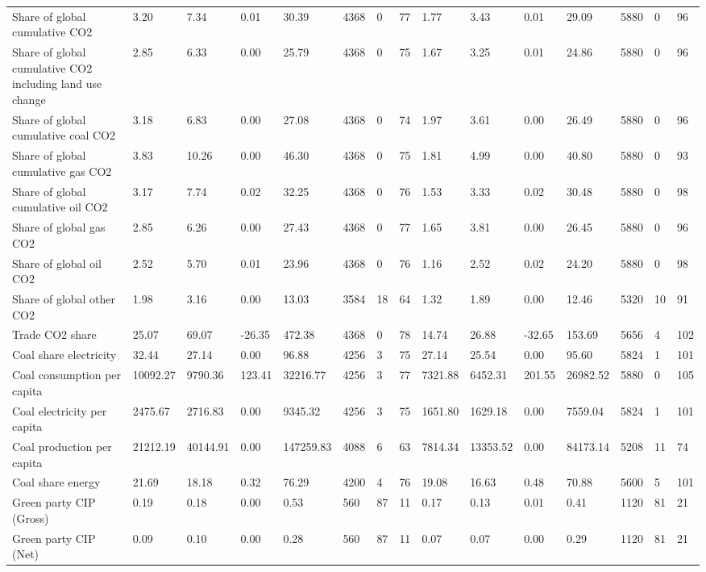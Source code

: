 \begin{longtable}{lllllllllllllll}
Share of global cumulative CO2 & 3.20 & 7.34 & 0.01 & 30.39 & 4368 & 0 & 77 & 1.77 & 3.43 & 0.01 & 29.09 & 5880 & 0 & 96\\
Share of global cumulative CO2 including land use change & 2.85 & 6.33 & 0.00 & 25.79 & 4368 & 0 & 75 & 1.67 & 3.25 & 0.01 & 24.86 & 5880 & 0 & 96\\
Share of global cumulative coal CO2 & 3.18 & 6.83 & 0.00 & 27.08 & 4368 & 0 & 74 & 1.97 & 3.61 & 0.00 & 26.49 & 5880 & 0 & 96\\
Share of global cumulative gas CO2 & 3.83 & 10.26 & 0.00 & 46.30 & 4368 & 0 & 75 & 1.81 & 4.99 & 0.00 & 40.80 & 5880 & 0 & 93\\
\addlinespace
Share of global cumulative oil CO2 & 3.17 & 7.74 & 0.02 & 32.25 & 4368 & 0 & 76 & 1.53 & 3.33 & 0.02 & 30.48 & 5880 & 0 & 98\\
Share of global gas CO2 & 2.85 & 6.26 & 0.00 & 27.43 & 4368 & 0 & 77 & 1.65 & 3.81 & 0.00 & 26.45 & 5880 & 0 & 96\\
Share of global oil CO2 & 2.52 & 5.70 & 0.01 & 23.96 & 4368 & 0 & 76 & 1.16 & 2.52 & 0.02 & 24.20 & 5880 & 0 & 98\\
Share of global other CO2 & 1.98 & 3.16 & 0.00 & 13.03 & 3584 & 18 & 64 & 1.32 & 1.89 & 0.00 & 12.46 & 5320 & 10 & 91\\
Trade CO2 share & 25.07 & 69.07 & -26.35 & 472.38 & 4368 & 0 & 78 & 14.74 & 26.88 & -32.65 & 153.69 & 5656 & 4 & 102\\
\addlinespace
Coal share electricity & 32.44 & 27.14 & 0.00 & 96.88 & 4256 & 3 & 75 & 27.14 & 25.54 & 0.00 & 95.60 & 5824 & 1 & 101\\
Coal consumption per capita & 10092.27 & 9790.36 & 123.41 & 32216.77 & 4256 & 3 & 77 & 7321.88 & 6452.31 & 201.55 & 26982.52 & 5880 & 0 & 105\\
Coal electricity per capita & 2475.67 & 2716.83 & 0.00 & 9345.32 & 4256 & 3 & 75 & 1651.80 & 1629.18 & 0.00 & 7559.04 & 5824 & 1 & 101\\
Coal production per capita & 21212.19 & 40144.91 & 0.00 & 147259.83 & 4088 & 6 & 63 & 7814.34 & 13353.52 & 0.00 & 84173.14 & 5208 & 11 & 74\\
Coal share energy & 21.69 & 18.18 & 0.32 & 76.29 & 4200 & 4 & 76 & 19.08 & 16.63 & 0.48 & 70.88 & 5600 & 5 & 101\\
\addlinespace
Green party CIP (Gross) & 0.19 & 0.18 & 0.00 & 0.53 & 560 & 87 & 11 & 0.17 & 0.13 & 0.01 & 0.41 & 1120 & 81 & 21\\
Green party CIP (Net) & 0.09 & 0.10 & 0.00 & 0.28 & 560 & 87 & 11 & 0.07 & 0.07 & 0.00 & 0.29 & 1120 & 81 & 21\\

\end{longtable}
